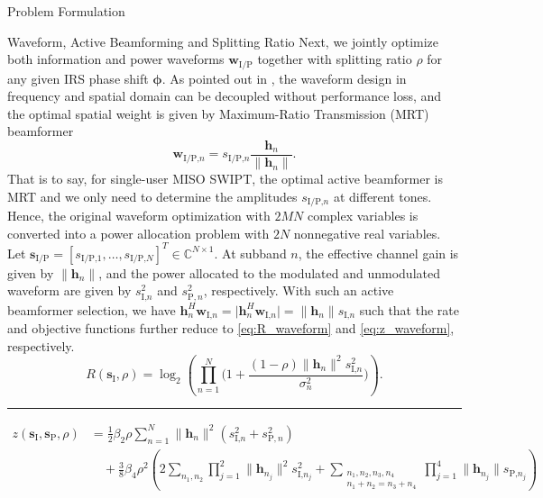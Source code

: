 \documentclass[journal]{IEEEtran}
\begin{document}
\begin{section}{Problem Formulation}
		\begin{subsection}{Waveform, Active Beamforming and Splitting Ratio}
			Next, we jointly optimize both information and power waveforms $\boldsymbol{w}_{\text{I/P}}$ together with splitting ratio $\rho$ for any given IRS phase shift $\boldsymbol{\phi}$. As pointed out in \cite{Clerckx2018b}, the waveform design in frequency and spatial domain can be decoupled without performance loss, and the optimal spatial weight is given by Maximum-Ratio Transmission (MRT) beamformer
			\begin{equation}\label{eq:w_IP}
				\boldsymbol{w}_{\text{I/P,}n}=s_{\text{I/P,}n}\frac{\boldsymbol{h}_n}{\lVert{\boldsymbol{h}_n}\rVert}.
			\end{equation}
			That is to say, for single-user MISO SWIPT, the optimal active beamformer is MRT and we only need to determine the amplitudes $s_{\text{I/P,}n}$ at different tones. Hence, the original waveform optimization with $2MN$ complex variables is converted into a power allocation problem with $2N$ nonnegative real variables. Let $\boldsymbol{s}_{\text{I/P}}=[s_{\text{I/P,}1},\dots,s_{\text{I/P,}N}]^T \in \mathbb{C}^{N \times 1}$. At subband $n$, the effective channel gain is given by $\lVert{\boldsymbol{h}_n}\rVert$, and the power allocated to the modulated and unmodulated waveform are given by $s_{\text{I,}n}^2$ and $s_{\text{P},n}^2$, respectively. With such an active beamformer selection, we have $\boldsymbol{h}_n^H\boldsymbol{w}_{\text{I,}n}=\lvert{\boldsymbol{h}_n^H\boldsymbol{w}_{\text{I,}n}}\rvert=\lVert{\boldsymbol{h}_n}\rVert s_{\text{I,}n}$ such that the rate and objective functions further reduce to \eqref{eq:R_waveform} and \eqref{eq:z_waveform}, respectively.
			\begin{equation}\label{eq:R_waveform}
				R(\boldsymbol{s}_{\text{I}},\rho) = \log_2\left(\prod_{n=1}^N\biggl(1+\frac{(1-\rho)\lVert{\boldsymbol{h}_n}\rVert^2 s_{\text{I,}n}^2}{\sigma_n^2}\biggr)\right).
			\end{equation}
			\begin{figure*}[b]
				\hrule
				\begin{align}
					z(\boldsymbol{s}_{\text{I}},\boldsymbol{s}_\text{P},\rho)
					& = \frac{1}{2}{\beta_2}{\rho} \sum_{n=1}^N \lVert{\boldsymbol{h}_n}\rVert^2(s_{\text{I,}n}^2+s_{\text{P},n}^2)\nonumber\\
					& \quad + \frac{3}{8}{\beta_4}{\rho^2} \left( 2\sum_{n_1,n_2} \prod_{j=1}^2 \lVert{\boldsymbol{h}_{n_j}}\rVert^2 s_{\text{I,}{n_j}}^2 + \sum_{\substack{{n_1},{n_2},{n_3},{n_4}\\{n_1}+{n_2}={n_3}+{n_4}}} \prod_{j=1}^4 \lVert{\boldsymbol{h}_{n_j}}\rVert s_{\text{P,}{n_j}} \right)\nonumber\\

\end{align}
\end{figure*}
\end{subsection}
\end{section}
\end{document}
